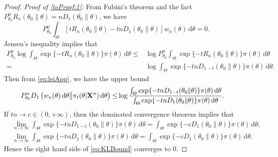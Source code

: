 \documentclass[11pt]{article}
\theoremstyle{plain}
\theoremstyle{definition}
\theoremstyle{remark}
\begin{document}
\begin{appendices}
\begin{proof}
\noindent\emph{Proof of \eqref{toProof:1}:}
From Fubini's theorem and the fact $P_{\theta_0}^n R_n (\theta_0\| \theta) = n D_1 (\theta_0 \| \theta)$, we have
\begin{equation*}
P_{\theta_0}^n\int_{\Theta}
    \left[   t R_n(\theta_0\| \theta) - tn D_1 (\theta_0 \| \theta )  \right]
    w_n (\theta) \, \mathrm d \theta
    =0
    .
\end{equation*}
Jensen's inequality implies that
\begin{align*}
    P_{\theta_0}^n \log \int_{\Theta} \exp \{-t R_n (\theta_0\| \theta)\} \pi (\theta) \, \mathrm d \theta  
    \leq &
    \log 
    P_{\theta_0}^n
    \int_{\Theta} \exp \{-t R_n (\theta_0\| \theta)\} \pi (\theta) \, \mathrm d \theta  
    \\
    =&
    \log 
    \int_{\Theta} \exp \{-tn D_{1-t}(\theta_0 \| \theta)\} \pi (\theta) \, \mathrm d \theta.
\end{align*}
Then from \eqref{eq:leiApp}, we have the upper bound
\begin{align}
    P_{\theta_0}^n
     D_1\left( 
        w_n (\theta) \, \mathrm d \theta
        \big\|
        \pi_t (\theta | \mathbf{X}^{n}) \, \mathrm d \theta
    \right)
    \leq &
    \log \frac{
        \int_{\Theta} \exp \{-tn D_{1-t}(\theta_0 \| \theta)\} \pi (\theta) \, \mathrm d \theta
    }
    {
    \int_{\Theta} \exp \{-tn D_{1}(\theta_0 \| \theta)\} \pi (\theta) \, \mathrm d \theta
}.
\label{eq:KLBound}
\end{align}
If $tn\to c \in (0, +\infty)$, 
then the dominated convergence theorem implies that
\begin{align*}
    &
    \lim_{n\to \infty} \int_{\Theta} \exp \{-tn D_{1-t}(\theta_0 \| \theta)\} \pi (\theta) \, \mathrm d \theta
    =
    \int_{\Theta} \exp \{-c D_{1}(\theta_0 \| \theta)\} \pi (\theta) \, \mathrm d \theta,
    \\
    &
    \lim_{n\to \infty} \int_{\Theta} \exp \{-tn D_{1}(\theta_0 \| \theta)\} \pi (\theta) \, \mathrm d \theta
    =
    \int_{\Theta} \exp \{-c D_{1}(\theta_0 \| \theta)\} \pi (\theta) \, \mathrm d \theta
    .
\end{align*}
Hence the right hand side of \eqref{eq:KLBound} converges to $0$.


\end{proof}
\end{appendices}
\end{document}
